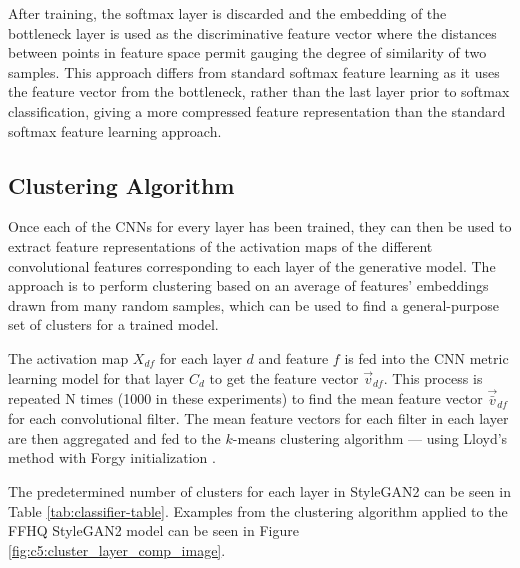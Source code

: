 After training, the softmax layer is discarded and the embedding of the bottleneck layer is used as the discriminative feature vector where the distances between points in feature space permit gauging the degree of similarity of two samples. 
This approach differs from standard softmax feature learning as it uses the feature vector from the bottleneck, rather than the last layer prior to softmax classification, giving a more compressed feature representation than the standard softmax feature learning approach.

\subsection{Clustering Algorithm}

\label{c5:sec:clustering}

Once each of the CNNs for every layer has been trained, they can then be used to extract feature representations of the activation maps of the different convolutional features corresponding to each layer of the generative model.
The approach is to perform clustering based on an average of features' embeddings drawn from many random samples, which can be used to find a general-purpose set of clusters for a trained model.

The activation map $X_{df}$ for each layer $d$ and feature $f$ is fed into the CNN metric learning model for that layer $C_d$ to get the feature vector $\vec{v}_{df}$. 
This process is repeated N times (1000 in these experiments) to find the mean feature vector $\vec{\bar{v}}_{df}$ for each convolutional filter.
The mean feature vectors for each filter in each layer are then aggregated and fed to the $k$-means clustering algorithm --- using Lloyd's method \citep{lloyd1982least} with Forgy initialization \citep{forgy1965cluster, celebi2013comparative}. 

The predetermined number of clusters for each layer in StyleGAN2 can be seen in Table \ref{tab:classifier-table}. 
Examples from the clustering algorithm applied to the FFHQ StyleGAN2 model can be seen in Figure \ref{fig:c5:cluster_layer_comp_image}.


